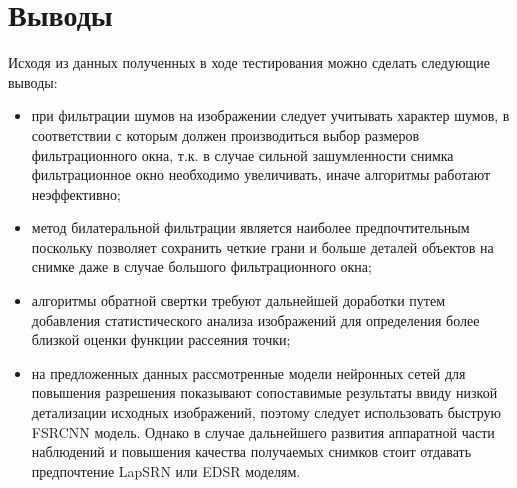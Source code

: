 \section{Выводы}

Исходя из данных полученных в ходе тестирования можно сделать следующие выводы:
\begin{itemize}
	\item при фильтрации шумов на изображении следует учитывать характер шумов, в соответствии с которым должен производиться выбор размеров фильтрационного окна, т.к. в случае сильной зашумленности снимка фильтрационное окно необходимо увеличивать, иначе алгоритмы работают неэффективно;
	\item метод билатеральной фильтрации является наиболее предпочтительным поскольку позволяет сохранить четкие грани и больше деталей объектов на снимке даже в случае большого фильтрационного окна;
	\item алгоритмы обратной свертки требуют дальнейшей доработки путем добавления статистического анализа изображений для определения более близкой оценки функции рассеяния точки;
	\item на предложенных данных рассмотренные модели нейронных сетей для повышения разрешения показывают сопоставимые результаты ввиду низкой детализации исходных изображений, поэтому следует использовать быструю FSRCNN модель. Однако в случае дальнейшего развития аппаратной части наблюдений и повышения качества получаемых снимков стоит отдавать предпочтение LapSRN или EDSR моделям.
\end{itemize}
